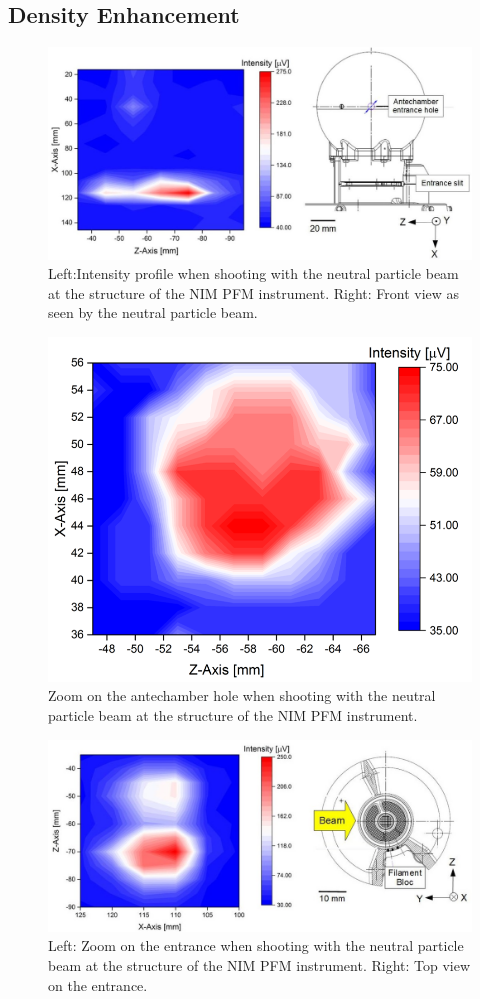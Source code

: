 	\subsection{Density Enhancement }
	\begin{figure}[h!]
		\centering
		\includegraphics[width=\textwidth]{Experiments/2D_scan_anteEntr.jpg}
		\caption{Left:Intensity profile when shooting with the neutral particle beam at the structure of the NIM PFM instrument. Right: Front view as seen by the neutral particle beam.}
		\label{exp:PFMIntCharTot}
	\end{figure}
	\begin{figure}[h!]
		\centering
		\includegraphics[width=.7\textwidth]{Experiments/2D_scan_Ant.png}
		\caption{Zoom on the antechamber hole when shooting with the neutral particle beam at the structure of the NIM PFM instrument.}
		\label{exp:PFMIntCharAnt}
	\end{figure}	
	\begin{figure}[h!]
		\centering
		\includegraphics[width=\textwidth]{Experiments/2D_scan_Entr.jpg}
		\caption{Left: Zoom on the entrance when shooting with the neutral particle beam at the structure of the NIM PFM instrument. Right: Top view on the entrance.}
		\label{exp:PFMIntCharEnt}
	\end{figure}
